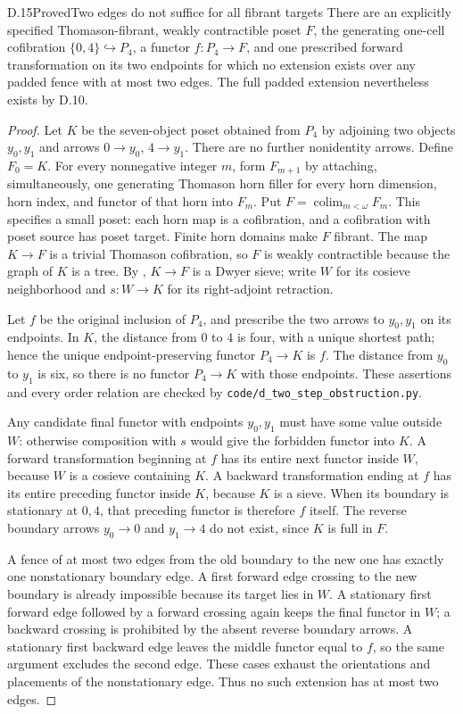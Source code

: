 \begin{claim}{D.15}{Proved}{Two edges do not suffice for all fibrant targets}
There are an explicitly specified Thomason-fibrant, weakly contractible poset $F$, the generating one-cell cofibration $\{0,4\}\hookrightarrow P_4$, a functor $f:P_4\to F$, and one prescribed forward transformation on its two endpoints for which no extension exists over any padded fence with at most two edges. The full padded extension nevertheless exists by D.10.
\end{claim}
\begin{proof}
Let $K$ be the seven-object poset obtained from $P_4$ by adjoining two objects $y_0,y_1$ and arrows $0\to y_0$, $4\to y_1$. There are no further nonidentity arrows. Define $F_0=K$. For every nonnegative integer $m$, form $F_{m+1}$ by attaching, simultaneously, one generating Thomason horn filler for every horn dimension, horn index, and functor of that horn into $F_m$. Put $F=\operatorname{colim}_{m<\omega}F_m$. This specifies a small poset: each horn map is a cofibration, and a cofibration with poset source has poset target. Finite horn domains make $F$ fibrant. The map $K\to F$ is a trivial Thomason cofibration, so $F$ is weakly contractible because the graph of $K$ is a tree. By \citet[Proposition~1]{D_Cisinski1999}, $K\to F$ is a Dwyer sieve; write $W$ for its cosieve neighborhood and $s:W\to K$ for its right-adjoint retraction.

Let $f$ be the original inclusion of $P_4$, and prescribe the two arrows to $y_0,y_1$ on its endpoints. In $K$, the distance from $0$ to $4$ is four, with a unique shortest path; hence the unique endpoint-preserving functor $P_4\to K$ is $f$. The distance from $y_0$ to $y_1$ is six, so there is no functor $P_4\to K$ with those endpoints. These assertions and every order relation are checked by \texttt{code/d\_two\_step\_obstruction.py}.

Any candidate final functor with endpoints $y_0,y_1$ must have some value outside $W$: otherwise composition with $s$ would give the forbidden functor into $K$. A forward transformation beginning at $f$ has its entire next functor inside $W$, because $W$ is a cosieve containing $K$. A backward transformation ending at $f$ has its entire preceding functor inside $K$, because $K$ is a sieve. When its boundary is stationary at $0,4$, that preceding functor is therefore $f$ itself. The reverse boundary arrows $y_0\to0$ and $y_1\to4$ do not exist, since $K$ is full in $F$.

A fence of at most two edges from the old boundary to the new one has exactly one nonstationary boundary edge. A first forward edge crossing to the new boundary is already impossible because its target lies in $W$. A stationary first forward edge followed by a forward crossing again keeps the final functor in $W$; a backward crossing is prohibited by the absent reverse boundary arrows. A stationary first backward edge leaves the middle functor equal to $f$, so the same argument excludes the second edge. These cases exhaust the orientations and placements of the nonstationary edge. Thus no such extension has at most two edges.
\end{proof}


